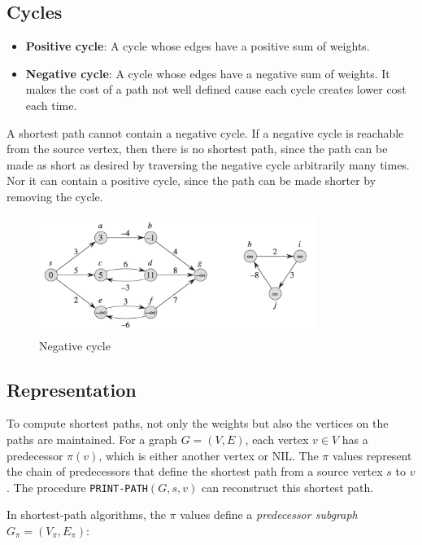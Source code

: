 \subsection*{Cycles}

\begin{itemize}
    \item \textbf{Positive cycle}: A cycle whose edges have a positive sum of weights.
    \item \textbf{Negative cycle}: A cycle whose edges have a negative sum of weights. It makes the cost of a path not well defined cause each cycle creates lower cost each time. 
\end{itemize}

A shortest path cannot contain a negative cycle. If a negative cycle is reachable from the source vertex, then there is no shortest path, since the path can be made as short as desired by traversing the negative cycle arbitrarily many times.
Nor it can contain a positive cycle, since the path can be made shorter by removing the cycle.

\begin{figure}[H]
    \centering
    \includegraphics[width=0.8\textwidth]{assets/neg_cycle.png}
    \caption{Negative cycle}
    \label{fig:negative_cycle}
\end{figure}

\subsection*{Representation}

To compute shortest paths, not only the weights but also the vertices on the paths are maintained. For a graph $G = (V, E)$, each vertex $v \in V$ has a predecessor $\pi(v)$, which is either another vertex or $\text{NIL}$. The $\pi$ values represent the chain of predecessors that define the shortest path from a source vertex $s$ to $v$. The procedure \texttt{PRINT-PATH}$(G, s, v)$ can reconstruct this shortest path.

In shortest-path algorithms, the $\pi$ values define a \textit{predecessor subgraph} $G_\pi = (V_\pi, E_\pi)$:

